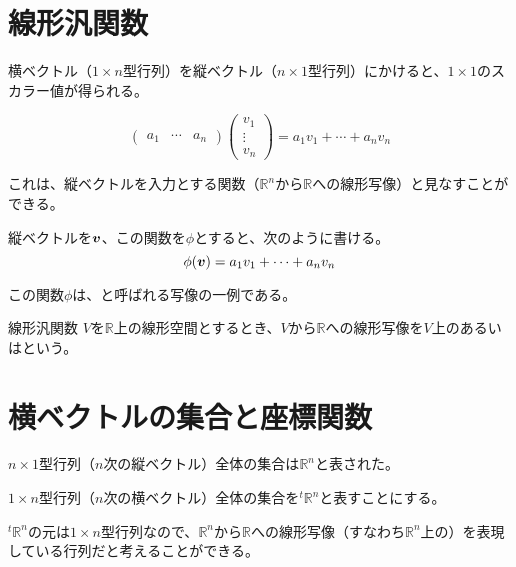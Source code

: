 \documentclass[../../../topic_linear-algebra]{subfiles}
\begin{document}
\sectionline
\section{線形汎関数}

横ベクトル（$1 \times n$型行列）を縦ベクトル（$n \times 1$型行列）にかけると、$1 \times 1$のスカラー値が得られる。

\begin{equation*}
  \begin{pmatrix}
    a_1 & \cdots & a_n
  \end{pmatrix} \begin{pmatrix}
    v_1    \\
    \vdots \\
    v_n
  \end{pmatrix}
  = a_1 v_1 + \cdots + a_n v_n
\end{equation*}

\br

これは、縦ベクトルを入力とする関数（$\mathbb{R}^n$から$\mathbb{R}$への線形写像）と見なすことができる。

縦ベクトルを$\vb*{v}$、この関数を$\phi$とすると、次のように書ける。
\begin{equation*}
  \phi(\vb*{v}) = a_1 v_1 + \cdots + a_n v_n
\end{equation*}

この関数$\phi$は、と呼ばれる写像の一例である。

\begin{definition}{線形汎関数}
  $V$を$\mathbb{R}$上の線形空間とするとき、$V$から$\mathbb{R}$への線形写像を$V$上のあるいはという。
\end{definition}

\sectionline
\section{横ベクトルの集合と座標関数}

$n \times 1$型行列（$n$次の縦ベクトル）全体の集合は$\mathbb{R}^n$と表された。

$1 \times n$型行列（$n$次の横ベクトル）全体の集合を${}^t\mathbb{R}^n$と表すことにする。

\br

${}^t\mathbb{R}^n$の元は$1 \times n$型行列なので、$\mathbb{R}^n$から$\mathbb{R}$への線形写像（すなわち$\mathbb{R}^n$上の）を表現している行列だと考えることができる。
\end{document}
